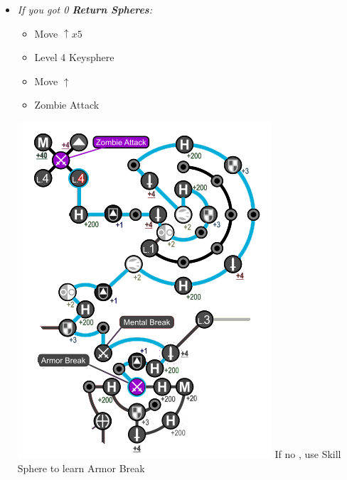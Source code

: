 \begin{spheregrid}
\begin{multicols}{2}
\begin{itemize}
\begin{itemize}
				      \item \textit{If you got 0 \textbf{Return Spheres}:}
				            \begin{itemize}
					            \item Move $\uparrow x5$
					            \item Level 4 Keysphere
					            \item Move $\uparrow$
					            \item Zombie Attack
				            \end{itemize}
						\includegraphics[width=.8\columnwidth]{graphics/Tidus_BFA}
				            \rikkuf If no \od, use Skill Sphere to learn Armor Break
			      \end{itemize}
		\end{itemize}
	\end{multicols}
\end{spheregrid}
